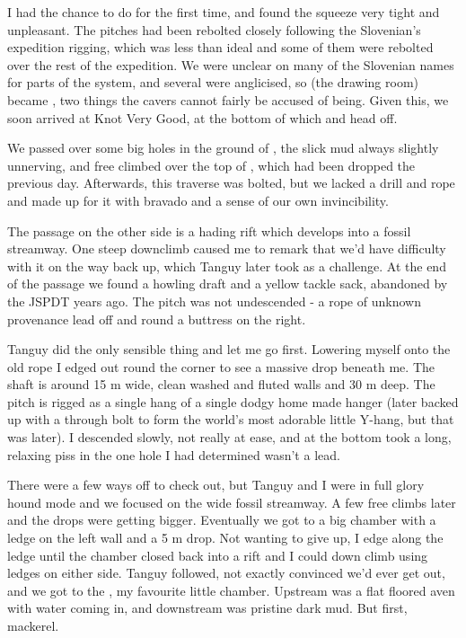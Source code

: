 I had the chance to do  for the first time, and found the squeeze very tight and unpleasant. The pitches had been rebolted closely following the Slovenian's expedition rigging, which was less than ideal and some of them were rebolted over the rest of the expedition. We were unclear on many of the Slovenian names for parts of the system, and several were anglicised, so  (the drawing room) became , two things the cavers cannot fairly be accused of being. Given this, we soon arrived at Knot Very Good, at the bottom of which  and  head off.
 
We passed over some big holes in the ground of , the slick mud always slightly unnerving, and free climbed over the top of , which had been dropped the previous day. Afterwards, this traverse was bolted, but we lacked a drill and rope and made up for it with bravado and a sense of our own invincibility.
 
The passage on the other side is a hading rift which develops into a fossil streamway. One steep downclimb caused me to remark that we'd have difficulty with it on the way back up, which Tanguy later took as a challenge. At the end of the passage we found a howling draft and a yellow tackle sack, abandoned by the JSPDT years ago. The pitch was not undescended -  a rope of unknown provenance lead off and round a buttress on the right.
 
Tanguy did the only sensible thing and let me go first. Lowering myself onto the old rope I edged out round the corner to see a massive drop beneath me. The shaft is around 15 m wide, clean washed and fluted walls and 30 m deep. The pitch is rigged as a single hang of a single dodgy home made hanger (later backed up with a through bolt to form the world's most adorable little Y-hang, but that was later). I descended slowly, not really at ease, and at the bottom took a long, relaxing piss in the one hole I had determined wasn't a lead.
 
There were a few ways off to check out, but Tanguy and I were in full glory hound mode and we focused on the wide fossil streamway. A few free climbs later and the drops were getting bigger. Eventually we got to a big chamber with a ledge on the left wall and a 5 m drop. Not wanting to give up, I edge along the ledge until the chamber closed back into a rift and I could down climb using ledges on either side. Tanguy followed, not exactly convinced we'd ever get out, and we got to the , my favourite little chamber. Upstream was a flat floored aven with water coming in, and downstream was pristine dark mud. But first, mackerel.
 
